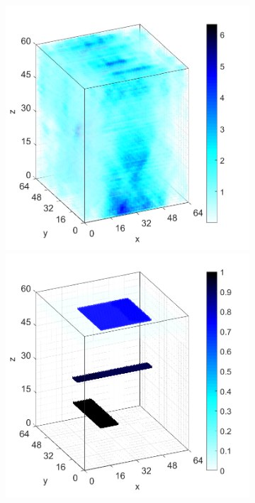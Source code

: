 \documentclass[9pt,twocolumn,twoside]{osajnl}
\begin{document}
\begin{figure}[H]
{\begin{subfigure}[b]{0.95\columnwidth}
\begin{minipage}[b]{0.13\columnwidth}
    \end{minipage}
    \includegraphics[width=0.27\columnwidth]{overlap_complex_BP_3d}
    \includegraphics[width=0.27\columnwidth]{overlap_complex_TwIST_3d}
    \caption{}
\end{subfigure}}


\end{figure}
\end{document}
